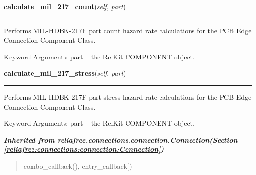 \hspace{.8\funcindent}\begin{boxedminipage}{\funcwidth}

    \raggedright \textbf{calculate\_mil\_217\_count}(\textit{self}, \textit{part})

    \vspace{-1.5ex}

    \rule{\textwidth}{0.5\fboxrule}
\setlength{\parskip}{2ex}
    Performs MIL-HDBK-217F part count hazard rate calculations for the PCB 
    Edge Connection Component Class.

    Keyword Arguments: part -- the RelKit COMPONENT object.

\setlength{\parskip}{1ex}
    \end{boxedminipage}

    \label{reliafree:connections:pcb:PCBEdge:calculate_mil_217_stress}

    \vspace{0.5ex}

\hspace{.8\funcindent}\begin{boxedminipage}{\funcwidth}

    \raggedright \textbf{calculate\_mil\_217\_stress}(\textit{self}, \textit{part})

    \vspace{-1.5ex}

    \rule{\textwidth}{0.5\fboxrule}
\setlength{\parskip}{2ex}
    Performs MIL-HDBK-217F part stress hazard rate calculations for the PCB
    Edge Connection Component Class.

    Keyword Arguments: part -- the RelKit COMPONENT object.

\setlength{\parskip}{1ex}
    \end{boxedminipage}


\large{\textbf{\textit{Inherited from reliafree.connections.connection.Connection\textit{(Section \ref{reliafree:connections:connection:Connection})}}}}

\begin{quote}
combo\_callback(), entry\_callback()
\end{quote}

